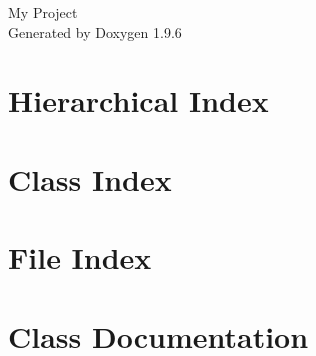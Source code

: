 \documentclass[twoside]{book}
\newcommand{\+}{\discretionary{\mbox{\scriptsize$\hookleftarrow$}}{}{}}
\newcommand{\clearemptydoublepage}{%
    \newpage{\pagestyle{empty}\cleardoublepage}%
  }
\begin{document}
  \raggedbottom
    \hypersetup{pageanchor=false,
                bookmarksnumbered=true,
                pdfencoding=unicode
               }
  \begin{titlepage}
  \vspace*{7cm}
  \begin{center}%
  {\Large My Project}\\
  \vspace*{1cm}
  {\large Generated by Doxygen 1.9.6}\\
  \end{center}
  \end{titlepage}
  \clearemptydoublepage
  \tableofcontents
  \clearemptydoublepage
  \hypersetup{pageanchor=true}
\chapter{Hierarchical Index}

\chapter{Class Index}

\chapter{File Index}

\chapter{Class Documentation}





















\end{document}
